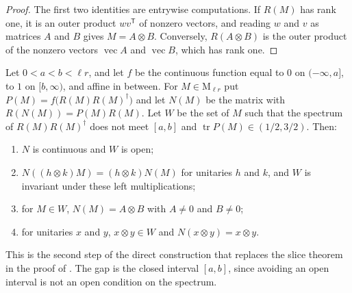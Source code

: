 \begin{proof}\leanok
    The first two identities are entrywise computations. If $R(M)$ has rank
    one, it is an outer product $wv^{\mathsf T}$ of nonzero vectors, and
    reading $w$ and $v$ as matrices $A$ and $B$ gives $M=A\otimes B$.
    Conversely, $R(A\otimes B)$ is the outer product of the nonzero vectors
    $\operatorname{vec}A$ and $\operatorname{vec}B$, which has rank one.
\end{proof}

\begin{lemma}
    \label{lem:nearest_kronecker_product}
    \leanok
    Let $0<a<b<\ell r$, and let $f$ be the continuous function equal to $0$ on
    $(-\infty,a]$, to $1$ on $[b,\infty)$, and affine in between. For
    $M\in\mathrm M_{\ell r}$ put $P(M)=f\bigl(R(M)R(M)^\dagger\bigr)$ and let
    $N(M)$ be the matrix with $R(N(M))=P(M)R(M)$. Let $W$ be the set of $M$
    such that the spectrum of $R(M)R(M)^\dagger$ does not meet $[a,b]$ and
    $\operatorname{tr}P(M)\in(1/2,3/2)$. Then:
    \begin{enumerate}
        \item $N$ is continuous and $W$ is open;
        \item $N((h\otimes k)M)=(h\otimes k)N(M)$ for unitaries $h$ and $k$,
              and $W$ is invariant under these left multiplications;
        \item for $M\in W$, $N(M)=A\otimes B$ with $A\neq0$ and $B\neq0$;
        \item for unitaries $x$ and $y$, $x\otimes y\in W$ and
              $N(x\otimes y)=x\otimes y$.
    \end{enumerate}
    This is the second step of the direct construction that replaces the
    slice theorem in the proof of \cite[Corollary~IV.7]{Cirac2017MPU}. The gap
    is the closed interval $[a,b]$, since avoiding an open interval is not an
    open condition on the spectrum.
\end{lemma}

